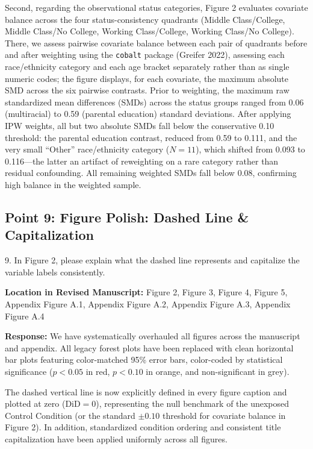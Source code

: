 \documentclass[11pt, letterpaper]{article}
\begin{document}
Second, regarding the observational status categories, Figure 2 evaluates covariate balance across the four status-consistency quadrants (Middle Class/College, Middle Class/No College, Working Class/College, Working Class/No College). There, we assess pairwise covariate balance between each pair of quadrants before and after weighting using the \texttt{cobalt} package (Greifer 2022), assessing each race/ethnicity category and each age bracket separately rather than as single numeric codes; the figure displays, for each covariate, the maximum absolute SMD across the six pairwise contrasts. Prior to weighting, the maximum raw standardized mean differences (SMDs) across the status groups ranged from 0.06 (multiracial) to 0.59 (parental education) standard deviations. After applying IPW weights, all but two absolute SMDs fall below the conservative 0.10 threshold: the parental education contrast, reduced from 0.59 to 0.111, and the very small ``Other'' race/ethnicity category ($N = 11$), which shifted from 0.093 to 0.116---the latter an artifact of reweighting on a rare category rather than residual confounding. All remaining weighted SMDs fall below 0.08, confirming high balance in the weighted sample.

\vspace{10pt}

\subsection*{Point 9: Figure Polish: Dashed Line \& Capitalization}

\begin{reviewercomment}
9. In Figure 2, please explain what the dashed line represents and capitalize the variable labels consistently.
\end{reviewercomment}

\textbf{Location in Revised Manuscript:} Figure 2, Figure 3, Figure 4, Figure 5, Appendix Figure A.1, Appendix Figure A.2, Appendix Figure A.3, Appendix Figure A.4

\textbf{Response:}
We have systematically overhauled all figures across the manuscript and appendix. All legacy forest plots have been replaced with clean horizontal bar plots featuring color-matched 95\% error bars, color-coded by statistical significance ($p < 0.05$ in red, $p < 0.10$ in orange, and non-significant in grey).

The dashed vertical line is now explicitly defined in every figure caption and plotted at zero ($\text{DiD} = 0$), representing the null benchmark of the unexposed Control Condition (or the standard $\pm 0.10$ threshold for covariate balance in Figure 2). In addition, standardized condition ordering and consistent title capitalization have been applied uniformly across all figures.
\end{document}
